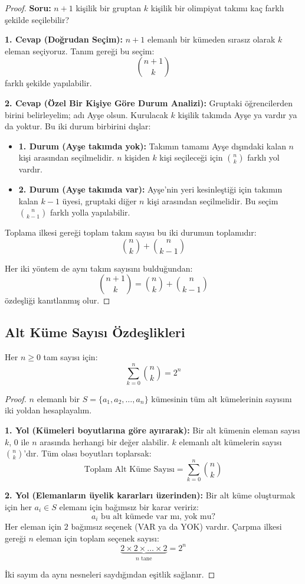 \begin{proof}
\textbf{Soru:} $n+1$ kişilik bir gruptan $k$ kişilik bir olimpiyat takımı kaç farklı şekilde seçilebilir?

\textbf{1. Cevap (Doğrudan Seçim):}
$n+1$ elemanlı bir kümeden sırasız olarak $k$ eleman seçiyoruz. Tanım gereği bu seçim:
\[ \binom{n+1}{k} \]
farklı şekilde yapılabilir.

\textbf{2. Cevap (Özel Bir Kişiye Göre Durum Analizi):}
Gruptaki öğrencilerden birini belirleyelim; adı Ayşe olsun.
Kurulacak $k$ kişilik takımda Ayşe ya vardır ya da yoktur. Bu iki durum birbirini dışlar:
\begin{itemize}
    \item \textbf{1. Durum (Ayşe takımda yok):} Takımın tamamı Ayşe dışındaki kalan $n$ kişi arasından seçilmelidir. $n$ kişiden $k$ kişi seçileceği için $\binom{n}{k}$ farklı yol vardır.
    \item \textbf{2. Durum (Ayşe takımda var):} Ayşe'nin yeri kesinleştiği için takımın kalan $k-1$ üyesi, gruptaki diğer $n$ kişi arasından seçilmelidir. Bu seçim $\binom{n}{k-1}$ farklı yolla yapılabilir.
\end{itemize}
Toplama ilkesi gereği toplam takım sayısı bu iki durumun toplamıdır:
\[ \binom{n}{k} + \binom{n}{k-1} \]

Her iki yöntem de aynı takım sayısını bulduğundan:
\[ \binom{n+1}{k} = \binom{n}{k} + \binom{n}{k-1} \]
özdeşliği kanıtlanmış olur.
\end{proof}

\subsection{Alt Küme Sayısı Özdeşlikleri}

\begin{theorem}
Her $n \ge 0$ tam sayısı için:
\[ \sum_{k=0}^{n} \binom{n}{k} = 2^n \]
\end{theorem}

\begin{proof}
$n$ elemanlı bir $S = \{a_1, a_2, \dots, a_n\}$ kümesinin tüm alt kümelerinin sayısını iki yoldan hesaplayalım.

\textbf{1. Yol (Kümeleri boyutlarına göre ayırarak):}
Bir alt kümenin eleman sayısı $k$, $0$ ile $n$ arasında herhangi bir değer alabilir. $k$ elemanlı alt kümelerin sayısı $\binom{n}{k}$'dır. Tüm olası boyutları toplarsak:
\[ \text{Toplam Alt Küme Sayısı} = \sum_{k=0}^{n} \binom{n}{k} \]

\textbf{2. Yol (Elemanların üyelik kararları üzerinden):}
Bir alt küme oluşturmak için her $a_i \in S$ elemanı için bağımsız bir karar veririz:
\[ a_i \text{ bu alt kümede var mı, yok mu?} \]
Her eleman için $2$ bağımsız seçenek (VAR ya da YOK) vardır. Çarpma ilkesi gereği $n$ eleman için toplam seçenek sayısı:
\[ \underbrace{2 \times 2 \times \dots \times 2}_{n \text{ tane}} = 2^n \]

İki sayım da aynı nesneleri saydığından eşitlik sağlanır.
\end{proof}

